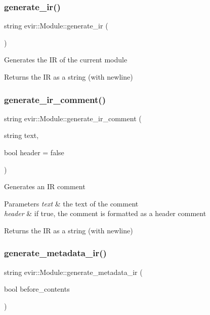 \subsubsection{\texorpdfstring{generate\+\_\+ir()}{generate\_ir()}}
{\footnotesize\ttfamily string evir\+::\+Module\+::generate\+\_\+ir (\begin{DoxyParamCaption}{ }\end{DoxyParamCaption})}

Generates the IR of the current module \begin{DoxyReturn}{Returns}
the IR as a string (with newline) 
\end{DoxyReturn}
\mbox{\label{classevir_1_1Module_a970b46de00ba0d01c8c1ed8356a64428}} 
\subsubsection{\texorpdfstring{generate\+\_\+ir\+\_\+comment()}{generate\_ir\_comment()}}
{\footnotesize\ttfamily string evir\+::\+Module\+::generate\+\_\+ir\+\_\+comment (\begin{DoxyParamCaption}\item[{string}]{text,  }\item[{bool}]{header = {\ttfamily false} }\end{DoxyParamCaption})}

Generates an IR comment 
\begin{DoxyParams}{Parameters}
{\em text} & the text of the comment \\
\hline
{\em header} & if true, the comment is formatted as a header comment \\
\hline
\end{DoxyParams}
\begin{DoxyReturn}{Returns}
the IR as a string (with newline) 
\end{DoxyReturn}
\mbox{\label{classevir_1_1Module_abd3b147a4e5c9e26bdb62c59461de25c}} 
\subsubsection{\texorpdfstring{generate\+\_\+metadata\+\_\+ir()}{generate\_metadata\_ir()}}
{\footnotesize\ttfamily string evir\+::\+Module\+::generate\+\_\+metadata\+\_\+ir (\begin{DoxyParamCaption}\item[{bool}]{before\+\_\+contents }\end{DoxyParamCaption})}

